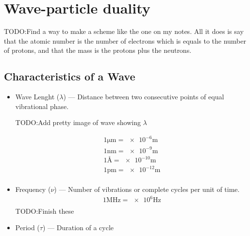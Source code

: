 \documentclass{article}[10pt]
\begin{document}
\section{Wave-particle duality}
TODO:\@ Find a way to make a scheme like the one on my notes. All it does is say
that the atomic number is the number of electrons which is equals to the number
of protons, and that the mass is the protons plus the neutrons.
\subsection{Characteristics of a Wave}
\begin{itemize}
    \item Wave Lenght ($\lambda$) --- Distance between two consecutive points of
          equal vibrational phase.

          TODO:\@ Add pretty image of wave showing $\lambda$

          \begin{align*}
              1\si{\micro\metre} = \num{e-6}\si{\metre} \\[0.5em]
              1\si{\nano\metre} = \num{e-9}\si{\metre}  \\[0.5em]
              1\si{\angstrom} = \num{e-10}\si{\metre}   \\[0.5em]
              1\si{\pico\metre} = \num{e-12}\si{\metre} \\[0.5em]
          \end{align*}
    \item Frequency ($\nu$) --- Number of vibrations or complete cycles per
          unit of time.
          \begin{align*}
              1\si{\mega\hertz} = \num{e6}\si{\hertz} \\[0.5em]
          \end{align*}
          TODO:\@ Finish these
    \item Period ($\tau$) --- Duration of a cycle
\end{itemize}
\end{document}
